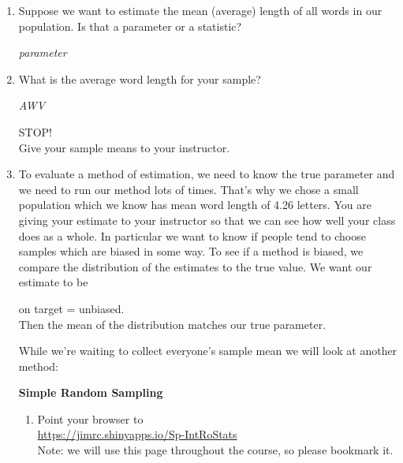\begin{enumerate}
\item Suppose we want to estimate the mean (average) length of all
  words in our population. Is that a parameter or a statistic?
\begin{students}
  \vspace{1cm}
\end{students}    
\begin{key}
   {\it parameter}
\end{key}
\item What is the average word length for your sample?
\begin{students}
  \vspace{1cm}
\end{students}    
\begin{key}
   {\it AWV}
\end{key}

  \begin{center}
    {\LARGE STOP!}\\
Give your sample means to your instructor.
  \end{center}

\item To evaluate a method of estimation, we need to know the true
  parameter and we need to run our method lots of times.  That's why we
  chose a small population which we know has mean word length of 4.26
  letters. You are giving your estimate to your instructor so that we
  can see how well your class does as a whole.  In particular we want
  to know if people tend to choose samples which are biased in some
  way. To see if a method is biased, we compare the distribution of
  the estimates to the true value.  We want our estimate to be
  \begin{center}
    {\large on target = unbiased.}\\
  Then the mean of the distribution matches our true parameter.
  \end{center}
  While we're waiting to collect everyone's sample mean we will look
  at another method:
  \begin{center}
    {\bf Simple Random Sampling}
  \end{center}
  \begin{enumerate}
    \item Point your browser to \\
         \url{https://jimrc.shinyapps.io/Sp-IntRoStats}
          \\ Note: we will use this page throughout the course, so
          please bookmark it.
     


\end{enumerate}
\end{enumerate}
